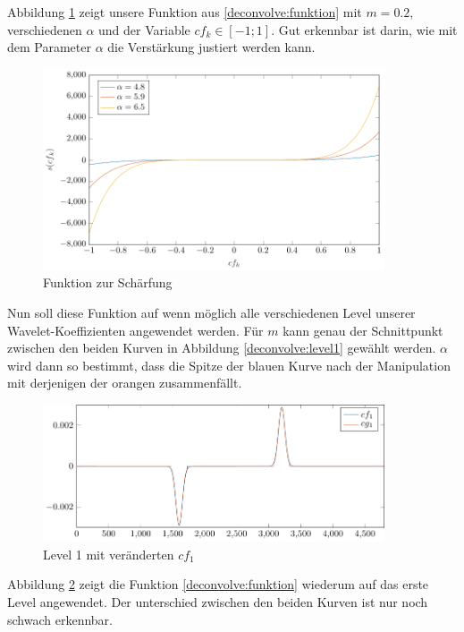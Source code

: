Abbildung \ref{deconvolve:function} zeigt unsere Funktion aus \eqref{deconvolve:funktion} mit $m=0.2$, verschiedenen $\alpha$ und der Variable $cf_k\in[-1;1]$.
Gut erkennbar ist darin, wie mit dem Parameter $\alpha$ die Verstärkung justiert werden kann.
\begin{figure}[h]
\centering
\includegraphics[width=0.9\textwidth]{./papers/deconvolve/pictures/function.pdf}
\caption{Funktion zur Schärfung\label{deconvolve:function}}
\end{figure}

Nun soll diese Funktion auf wenn möglich alle verschiedenen Level unserer Wavelet-Koeffizienten angewendet werden.
Für $m$ kann genau der Schnittpunkt zwischen den beiden Kurven in Abbildung \ref{deconvolve:level1} gewählt werden.
$\alpha$ wird dann so bestimmt, dass die Spitze der blauen Kurve nach der Manipulation mit derjenigen der orangen zusammenfällt.
\begin{figure}[h]
\centering
\includegraphics[width=0.9\textwidth]{./papers/deconvolve/pictures/level/level1_n.pdf}
\caption{Level 1 mit veränderten $cf_1$\label{deconvolve:level1_n}}
\end{figure}

Abbildung \ref{deconvolve:level1_n} zeigt die Funktion \eqref{deconvolve:funktion} wiederum auf das erste Level angewendet.
Der unterschied zwischen den beiden Kurven ist nur noch schwach erkennbar.

